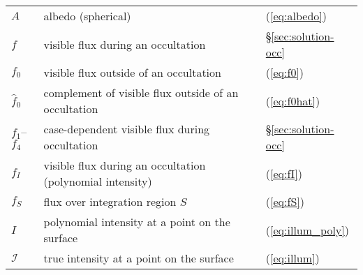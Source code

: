 \begin{center}
\begin{longtable}{W{c}{1cm} W{l}{9cm} W{l}{2cm}}
        \midrule
        $A$
         & albedo (spherical)
         & (\ref{eq:albedo})
        \\
        $f$
         & visible flux during an occultation
         & \S\ref{sec:solution-occ}
        \\
        $f_0$
         & visible flux outside of an occultation
         & (\ref{eq:f0})
        \\
        $\hat{f}_0$
         & complement of visible flux outside of an occultation
         & (\ref{eq:f0hat})
        \\
        $f_1$--$f_{4}$
         & case-dependent visible flux during occultation
         & \S\ref{sec:solution-occ}
        \\
        $f_I$
         & visible flux during an occultation (polynomial intensity)
         & (\ref{eq:fI})
        \\
        $f_S$
         & flux over integration region $S$
         & (\ref{eq:fS})
        \\
        $I$
         & polynomial intensity at a point on the surface
         & (\ref{eq:illum_poly})
        \\
        $\mathcal{I}$
         & true intensity at a point on the surface
         & (\ref{eq:illum})
        \\
    \end{longtable}
\end{center}

\vfill
\pagebreak

